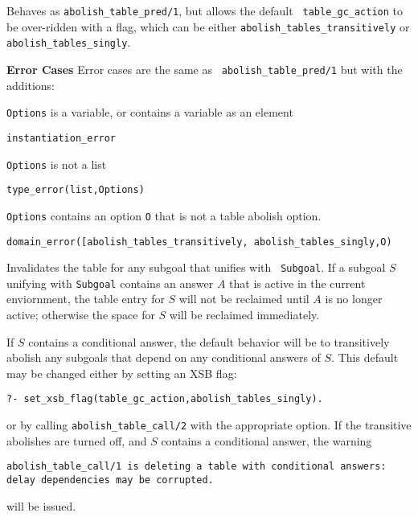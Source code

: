 \begin{description}
\begin{description}
%
Behaves as {\tt abolish\_table\_pred/1}, but allows the default {\tt
  table\_gc\_action} to be over-ridden with a flag, which can be either 
{\tt abolish\_tables\_transitively} or {\tt abolish\_tables\_singly}.

{\bf Error Cases} Error cases are the same as {\tt
  abolish\_table\_pred/1} but with the additions: 
\bi
\item {\tt Options} is a variable, or contains a variable as an element
\bi
\item {\tt instantiation\_error}
\ei
\item {\tt Options} is not a list
\bi
\item {\tt type\_error(list,Options)}
\ei
\item {\tt Options} contains an option {\tt O} that is not a
  table abolish option.
\bi
\item {\tt domain\_error([abolish\_tables\_transitively, abolish\_tables\_singly,O)}
\ei
\ei

%
Invalidates the table for any subgoal that unifies with {\tt
 Subgoal}.  If a subgoal $S$ unifying with {\tt Subgoal} contains
an answer $A$ that is active in the current enviornment, the table
entry for $S$ will not be reclaimed until $A$ is no longer active;
otherwise the space for $S$ will be reclaimed immediately.

If $S$ contains a conditional answer, the default behavior will be to
transitively abolish any subgoals that depend on any conditional
answers of $S$.  This default may be changed either by setting an XSB
flag:
%
\begin{verbatim}
?- set_xsb_flag(table_gc_action,abolish_tables_singly).
\end{verbatim}
% 
or by calling {\tt abolish\_table\_call/2} with the appropriate
option.  If the transitive abolishes are turned off, and $S$ contains
a conditional answer, the warning

{\tt abolish\_table\_call/1 is deleting a table with
  conditional\ answers: \\ delay dependencies may be corrupted.}

will be issued.  


\end{description}
\end{description}
